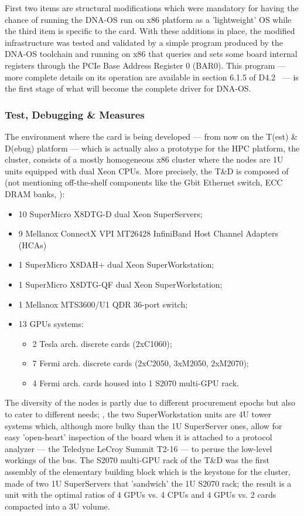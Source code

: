 First two items are structural modifications which were mandatory for
having the chance of running the DNA-OS run on x86 platform as a
'lightweight' OS while the third item is specific to the \apenetp
card.
With these additions in place, the modified infrastructure was tested
and validated by a simple program produced by the DNA-OS toolchain and
running on x86 that queries and sets some board internal registers
through the PCIe Base Address Register 0 (BAR0).
This program --- more complete details on its operation are available
in section 6.1.5 of D4.2~\cite{euretile:D4_2}  --- is the first stage of what will become the complete
\apenetp driver for DNA-OS.


\subsubsection{Test, Debugging \& Measures}
\label{sec:IBinstall}
The environment where the \apenetp card is being developed --- from
now on the T(est) \& D(ebug) platform --- which is actually also a
prototype for the \euretile HPC platform, the \quong cluster, consists
of a mostly homogeneous x86 cluster where the nodes are 1U units
equipped with dual Xeon CPUs.
More precisely, the T\&D is composed of (not mentioning off-the-shelf
components like the Gbit Ethernet switch, ECC DRAM banks, \etc):
\begin{itemize}
\item 10 SuperMicro X8DTG-D dual Xeon SuperServers;
\item 9 Mellanox ConnectX VPI MT26428 InfiniBand Host Channel Adapters (HCAs)
\item 1 SuperMicro X8DAH+ dual Xeon SuperWorkstation;
\item 1 SuperMicro X8DTG-QF dual Xeon SuperWorkstation;
\item 1 Mellanox MTS3600/U1 QDR 36-port switch;
\item 13 \nvidia GPUs systems:
\begin{itemize}
\item 2 Tesla arch. discrete cards (2xC1060);
\item 7 Fermi arch. discrete cards (2xC2050, 3xM2050, 2xM2070);
\item 4 Fermi arch. cards housed into 1 S2070 multi-GPU rack.
\end{itemize}
\end{itemize}

The diversity of the nodes is partly due to different procurement
epochs but also to cater to different needs; \eg, the two
SuperWorkstation units are 4U tower systems which, although more bulky
than the 1U SuperServer ones, allow for easy 'open-heart' inspection
of the \apenetp board when it is attached to a protocol analyzer ---
\eg the Teledyne LeCroy Summit T2-16 --- to peruse the low-level
workings of the \PCIe bus.
The S2070 multi-GPU rack of the T\&D was the first assembly of the
elementary building block which is the keystone for the \quong
cluster, made of two 1U SuperServers that 'sandwich' the 1U S2070
rack; the result is a unit with the optimal ratios of 4 GPUs vs. 4
CPUs and 4 GPUs vs. 2 \apenetp cards compacted into a 3U volume.

